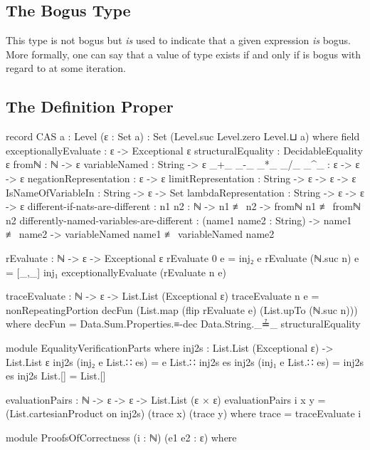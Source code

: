 \documentclass{report}
\begin{document}
\subsection{The Bogus Type}
This type is not bogus but \emph{is} used to indicate that a given expression \emph{is} bogus.  More formally, one can say that a value of type    exists if and only if  is bogus with regard to   at some iteration.

\subsection{The Definition Proper}

\begin{code}
record CAS {a : Level} (ε : Set a) : Set (Level.suc Level.zero Level.⊔ a) where
  field
    exceptionallyEvaluate : ε -> Exceptional ε
    structuralEquality : DecidableEquality ε
    fromℕ : ℕ -> ε
    variableNamed : String -> ε
    _+_
     _-_
     _*_
     _/_
     _^_ : ε -> ε -> ε
    negationRepresentation : ε -> ε
    limitRepresentation : String -> ε -> ε -> ε
    IsNameOfVariableIn : String -> ε -> Set
    lambdaRepresentation : String -> ε -> ε -> ε
    different-if-nats-are-different :
      {n1 n2 : ℕ} -> n1 ≢ n2 -> fromℕ n1 ≢ fromℕ n2
    differently-named-variables-are-different :
      (name1 name2 : String) ->
      name1 ≢ name2 ->
      variableNamed name1 ≢ variableNamed name2

  rEvaluate : ℕ -> ε -> Exceptional ε
  rEvaluate 0 e = inj₂ e
  rEvaluate (ℕ.suc n) e = [_,_] inj₁ exceptionallyEvaluate (rEvaluate n e)

  traceEvaluate : ℕ -> ε -> List.List (Exceptional ε)
  traceEvaluate n e =
    nonRepeatingPortion decFun (List.map (flip rEvaluate e) (List.upTo (ℕ.suc n)))
      where decFun = Data.Sum.Properties.≡-dec Data.String._≟_ structuralEquality

  module EqualityVerificationParts where
    inj2s : List.List (Exceptional ε) -> List.List ε
    inj2s (inj₂ e List.∷ es) = e List.∷ inj2s es
    inj2s (inj₁ e List.∷ es) = inj2s es
    inj2s List.[] = List.[]

    evaluationPairs : ℕ -> ε -> ε -> List.List (ε × ε)
    evaluationPairs i x y = (List.cartesianProduct on inj2s) (trace x) (trace y)
      where
      trace = traceEvaluate i

    module ProofsOfCorrectness
      (i : ℕ)
      (e1 e2 : ε) where


\end{code}
\end{document}
